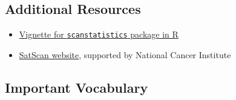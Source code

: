 \documentclass[
]{book}
\providecommand{\tightlist}{%
  \setlength{\itemsep}{0pt}\setlength{\parskip}{0pt}}
\begin{document}
\hypertarget{additional-resources-8}{%
\subsection{Additional Resources}\label{additional-resources-8}}

\begin{itemize}
\tightlist
\item
  \href{https://github.com/BenjaK/scanstatistics}{Vignette for \texttt{scanstatistics} package in R}
\item
  \href{https://www.satscan.org/}{SatScan website}, supported by National Cancer Institute
\end{itemize}

\hypertarget{important-vocabulary-8}{%
\subsection{Important Vocabulary}\label{important-vocabulary-8}}

 
  \providecommand{\huxb}[2]{\arrayrulecolor[RGB]{#1}\global\arrayrulewidth=#2pt}
  \providecommand{\huxvb}[2]{\color[RGB]{#1}\vrule width #2pt}
  \providecommand{\huxtpad}[1]{\rule{0pt}{#1}}
  \providecommand{\huxbpad}[1]{\rule[-#1]{0pt}{#1}}
\end{document}
